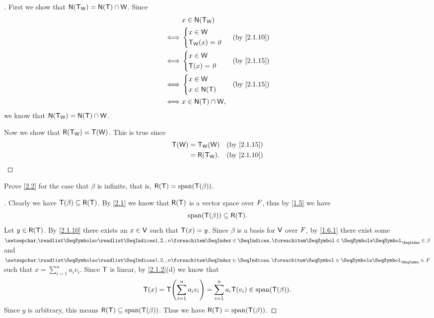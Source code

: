 \begin{proof}[]
	First we show that \(\ns{\T_{\W}} = \ns{\T} \cap \W\).
	Since
	\begin{align*}
		     & x \in \ns{\T_{\W}}                    \\
		\iff & \begin{dcases}
			       x \in \W \\
			       \T_{\W}(x) = \zv
		       \end{dcases}       &  & \by{2.1.10}   \\
		\iff & \begin{dcases}
			       x \in \W \\
			       \T(x) = \zv
		       \end{dcases}         &  & \by{2.1.15} \\
		\iff & \begin{dcases}
			       x \in \W \\
			       x \in \ns{\T}
		       \end{dcases}         &  & \by{2.1.15} \\
		\iff & x \in \ns{\T} \cap \W,
	\end{align*}
	we know that \(\ns{\T_{\W}} = \ns{\T} \cap \W\).

	Now we show that \(\rg{\T_{\W}} = \T(\W)\).
	This is true since
	\begin{align*}
		\T(\W) & = \T_{\W}(\W)   &  & \by{2.1.15} \\
		       & = \rg{\T_{\W}}. &  & \by{2.1.10}
	\end{align*}
\end{proof}

\begin{ex}\label{ex:2.1.33}
	Prove \cref{2.2} for the case that \(\beta\) is infinite, that is, \(\rg{\T} = \spn{\T(\beta)}\).
\end{ex}

\begin{proof}[]
	Clearly we have \(\T(\beta) \subseteq \rg{\T}\).
	By \cref{2.1} we know that \(\rg{\T}\) is a vector space over \(\mathit{F}\), thus by \cref{1.5} we have
	\[
		\spn{\T(\beta)} \subseteq \rg{\T}.
	\]
	Let \(y \in \rg{\T}\).
	By \cref{2.1.10} there exists an \(x \in \mathsf{V}\) such that \(\mathsf{T}(x) = y\).
	Since \(\beta\) is a basis for \(\mathsf{V}\) over \(\mathit{F}\), by \cref{1.6.1} there exist some \(\seq{v}{1,2,,n} \in \beta\) and \(\seq{a}{1,2,,n} \in \F\) such that \(x = \sum_{i = 1}^n a_i v_i\).
	Since \(\mathsf{T}\) is linear, by \cref{2.1.2}(d) we know that
	\[
		\T(x) = \T\pa{\sum_{i = 1}^n a_i v_i} = \sum_{i = 1}^n a_i \T(v_i) \in \spn{\T(\beta)}.
	\]
	Since \(y\) is arbitrary, this means \(\rg{\T} \subseteq \spn{\T(\beta)}\).
	Thus we have \(\rg{\T} = \spn{\T(\beta)}\).
\end{proof}

